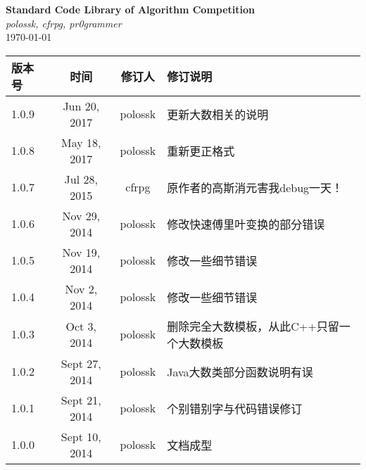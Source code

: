 \documentclass[12pt,a4paper,openany,oneside]{book}
\title{\strtitle}
\author{\strauthor}
\date{\today}
\newcommand\strtitle{Standard Code Library of Algorithm Competition}
\newcommand\strauthor{polossk, cfrpg, pr0grammer}
\begin{document}
\begin{titlepage}
\vspace*{\fill}
\begin{center}
    {\Huge \bf \strtitle} \\
    \vspace{1em}
    {\Large \it \strauthor} \\
    \vspace{1em}
    {\large \today} \\
\end{center}
\vspace{1em}
\begin{longtable}{|l|c|c|l|}
    \hline
    版本号 & 时间 & 修订人 & 修订说明 \\
    \hline
    1.0.9 & Jun 20, 2017 & polossk & 更新大数相关的说明 \\
    \hline
    1.0.8 & May 18, 2017 & polossk & 重新更正格式 \\
    \hline
    1.0.7 & Jul 28, 2015 & cfrpg & 原作者的高斯消元害我debug一天！ \\
    \hline
    1.0.6 & Nov 29, 2014 & polossk & 修改快速傅里叶变换的部分错误 \\
    \hline
    1.0.5 & Nov 19, 2014 & polossk & 修改一些细节错误 \\
    \hline
    1.0.4 & Nov 2, 2014 & polossk & 修改一些细节错误 \\
    \hline
    1.0.3 & Oct 3, 2014 & polossk & 删除完全大数模板，从此C++只留一个大数模板 \\
    \hline
    1.0.2 & Sept 27, 2014 & polossk & Java大数类部分函数说明有误 \\
    \hline
    1.0.1 & Sept 21, 2014 & polossk & 个别错别字与代码错误修订 \\
    \hline
    1.0.0 & Sept 10, 2014 & polossk & 文档成型 \\
    \hline
\end{longtable}
\end{titlepage}
\thispagestyle{fancy}
\clearpage
{}
{}
\tableofcontents
\clearpage









\end{document}

